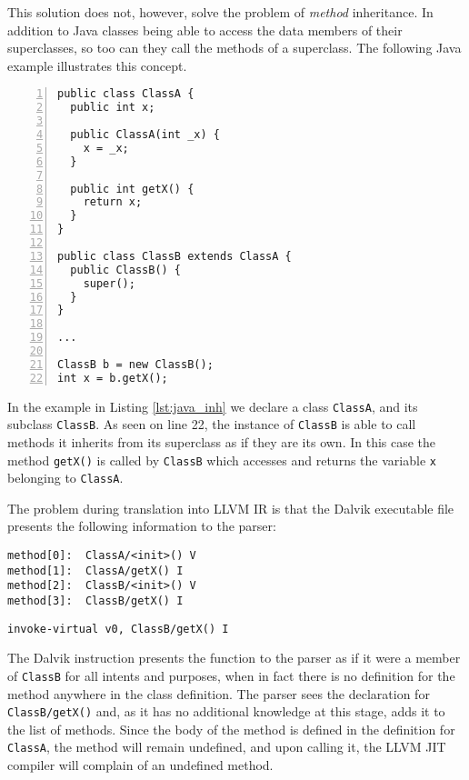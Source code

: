 This solution does not, however, solve the problem of \emph{method} inheritance. In addition to Java classes being able to access the data members of their superclasses, so too can they call the methods of a superclass. The following Java example illustrates this concept.

\newpage

\lstset{
	language=Java,
	basicstyle=\small,
	stringstyle=\ttfamily
}

\begin{lstlisting}[frame=single, numbers=left, numberstyle=\tiny, caption={Java Method Inheritance}, label=lst:java_inh]
public class ClassA {
  public int x;
  
  public ClassA(int _x) {
    x = _x;
  }
  
  public int getX() {
    return x;
  }
}

public class ClassB extends ClassA {
  public ClassB() {
    super();
  }
}

...

ClassB b = new ClassB();
int x = b.getX();
\end{lstlisting}

In the example in Listing \ref{lst:java_inh} we declare a class \verb|ClassA|, and its subclass \verb|ClassB|. As seen on line 22, the instance of \verb|ClassB| is able to call methods it inherits from its superclass as if they are its own. In this case the method \verb|getX()| is called by \verb|ClassB| which accesses and returns the variable \verb|x| belonging to \verb|ClassA|.

The problem during translation into LLVM IR is that the Dalvik executable file presents the following information to the parser:

\lstset{
	language=Assembly,
	basicstyle=\small,
	stringstyle=\ttfamily
}

\begin{lstlisting}[frame=single]
method[0]:  ClassA/<init>() V
method[1]:  ClassA/getX() I
method[2]:  ClassB/<init>() V
method[3]:  ClassB/getX() I
\end{lstlisting}

\begin{lstlisting}[frame=single]
invoke-virtual v0, ClassB/getX() I
\end{lstlisting}

The Dalvik instruction presents the function to the parser as if it were a member of \verb|ClassB| for all intents and purposes, when in fact there is no definition for the method anywhere in the class definition. The parser sees the declaration for \verb|ClassB/getX()| and, as it has no additional knowledge at this stage, adds it to the list of methods. Since the body of the method is defined in the definition for \verb|ClassA|, the method will remain undefined, and upon calling it, the LLVM JIT compiler will complain of an undefined method.

